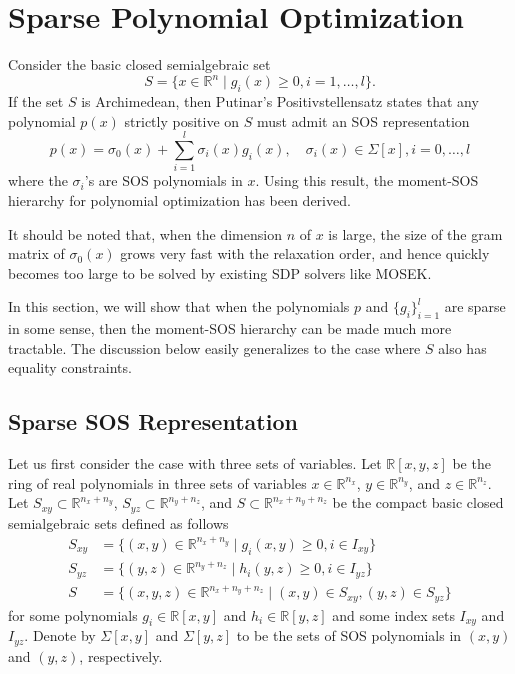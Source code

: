 \documentclass[
]{book}
\theoremstyle{definition}
\theoremstyle{definition}
\theoremstyle{definition}
\theoremstyle{definition}
\theoremstyle{remark}
\begin{document}
\section{Sparse Polynomial Optimization}\label{sparse-polynomial-optimization}

Consider the basic closed semialgebraic set
\begin{equation}
S = \{ x \in \mathbb{R}^{n} \mid g_i(x) \geq 0, i=1,\dots,l \}.
\label{eq:constraint-set-sparse}
\end{equation}
If the set \(S\) is Archimedean, then Putinar's Positivstellensatz states that any polynomial \(p(x)\) strictly positive on \(S\) must admit an SOS representation
\begin{equation}
p(x) = \sigma_0(x) + \sum_{i=1}^l \sigma_i(x) g_i(x), \quad \sigma_i(x) \in \Sigma[x], i=0,\dots,l
\label{eq:Putinar-Psatz-restate}
\end{equation}
where the \(\sigma_i\)'s are SOS polynomials in \(x\). Using this result, the moment-SOS hierarchy for polynomial optimization has been derived.

It should be noted that, when the dimension \(n\) of \(x\) is large, the size of the gram matrix of \(\sigma_0(x)\) grows very fast with the relaxation order, and hence quickly becomes too large to be solved by existing SDP solvers like MOSEK.

In this section, we will show that when the polynomials \(p\) and \(\{ g_i \}_{i=1}^l\) are sparse in some sense, then the moment-SOS hierarchy can be made much more tractable. The discussion below easily generalizes to the case where \(S\) also has equality constraints.

\subsection{Sparse SOS Representation}\label{sparse-sos-representation}

Let us first consider the case with three sets of variables. Let \(\mathbb{R}[x,y,z]\) be the ring of real polynomials in three sets of variables \(x \in \mathbb{R}^{n_x}\), \(y \in \mathbb{R}^{n_y}\), and \(z \in \mathbb{R}^{n_z}\). Let \(S_{xy} \subset \mathbb{R}^{n_x + n_y}\), \(S_{yz} \subset \mathbb{R}^{n_y + n_z}\), and \(S \subset \mathbb{R}^{n_x + n_y + n_z}\) be the compact basic closed semialgebraic sets defined as follows
\begin{equation}
\begin{split}
S_{xy} &= \{ (x,y) \in \mathbb{R}^{n_x + n_y} \mid g_i(x,y) \geq 0, i \in I_{xy} \} \\
S_{yz} &= \{ (y,z) \in \mathbb{R}^{n_y + n_z} \mid h_i(y,z) \geq 0, i \in I_{yz} \} \\
S &= \{ (x,y,z) \in \mathbb{R}^{n_x + n_y + n_z} \mid (x,y) \in S_{xy}, (y,z) \in S_{yz} \}
\end{split}
\label{eq:three-sets-definition}
\end{equation}
for some polynomials \(g_i \in \mathbb{R}[x,y]\) and \(h_i \in \mathbb{R}[y,z]\) and some index sets \(I_{xy}\) and \(I_{yz}\). Denote by \(\Sigma[x,y]\) and \(\Sigma[y,z]\) to be the sets of SOS polynomials in \((x,y)\) and \((y,z)\), respectively.
\end{document}
